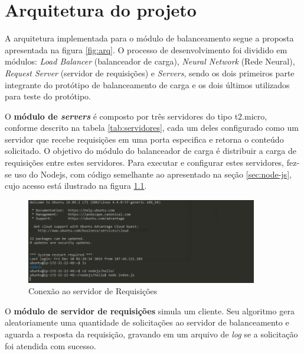 \chapter{Arquitetura do projeto}\label{cap:desenvolvimento}

A arquitetura implementada para o módulo de balanceamento segue a proposta apresentada na figura \ref{fig:arq}. O processo de desenvolvimento foi dividido em módulos: \textit{Load Balancer} (balanceador de carga), \textit{Neural Network} (Rede Neural), \textit{Request Server} (servidor de requisições) e \textit{Servers}, sendo os dois primeiros parte integrante do protótipo de balanceamento de carga e os dois últimos utilizados para teste do protótipo. 

O \textbf{módulo de \textit{servers}} é composto por três servidores do tipo t2.micro, conforme descrito na tabela \ref{tab:servidores}, cada um deles configurado como um servidor que recebe requisições em uma porta especifica e retorna o conteúdo solicitado. O objetivo do módulo do balanceador de carga é distribuir a carga de requisições entre estes servidores. Para executar e configurar estes servidores, fez-se uso do Nodejs, com código semelhante ao apresentado na seção \ref{sec:node-js}, cujo acesso está ilustrado na figura \ref{fig:serv-req}. 
\begin{figure}[htb]
	\caption{\label{fig:serv-req}Conexão ao servidor de Requisições}
	\begin{center}
		\includegraphics[width=0.90\textwidth]{img/servidor.png}
	\end{center}
\end{figure}

O \textbf{módulo de servidor de requisições} simula um cliente. Seu algoritmo gera aleatoriamente uma quantidade de solicitações ao servidor de balanceamento e aguarda a resposta da requisição, gravando em um arquivo de \textit{log} se a solicitação foi atendida com sucesso. 

